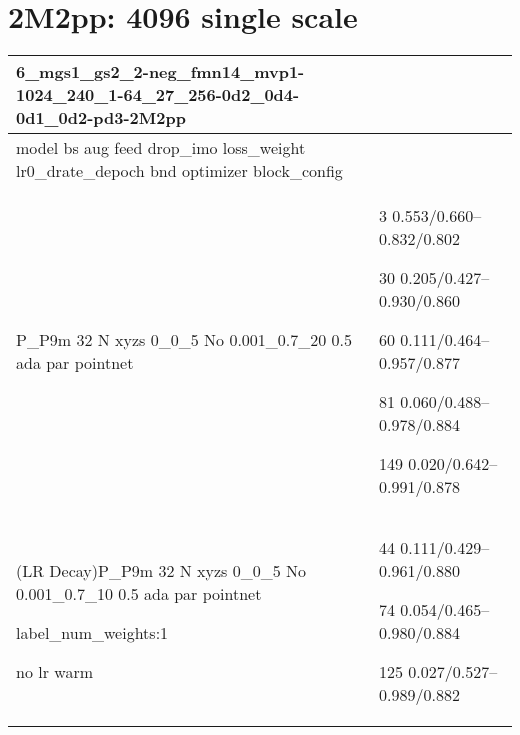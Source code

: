 \documentclass[,table,dvipsnames]{article}
\begin{document}
\section{2M2pp: 4096 single scale}
\noindent\begin{tabular}{|p{10cm}|p{5.5cm}| }	
\hline
6\_mgs1\_gs2\_2-neg\_fmn14\_mvp1-1024\_240\_1-64\_27\_256-0d2\_0d4-0d1\_0d2-pd3-2M2pp & \\
\hline
model bs aug feed drop\_imo loss\_weight lr0\_drate\_depoch bnd optimizer block\_config&\\

\rowcolor{green!20}
P\_P9m 32 N xyzs 0\_0\_5 No 0.001\_0.7\_20 0.5 ada par pointnet& 3 0.553/0.660--0.832/0.802\par 30 0.205/0.427--0.930/0.860\par 60 0.111/0.464--0.957/0.877\par 81 0.060/0.488--0.978/0.884\par 149 0.020/0.642--0.991/0.878\\

\rowcolor{red!20}
(LR Decay)P\_P9m 32 N xyzs 0\_0\_5 No 0.001\_0.7\_10 0.5 ada par pointnet \par label\_num\_weights:1 \par no lr warm& 44 0.111/0.429--0.961/0.880 \par 74 0.054/0.465--0.980/0.884\par 125 0.027/0.527--0.989/0.882\\
\hline 	
\end{tabular}
\end{document}
